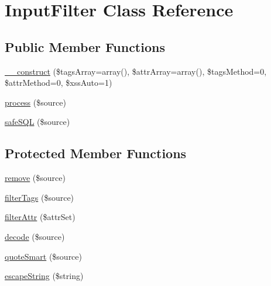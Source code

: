 \hypertarget{class_input_filter}{\section{Input\-Filter Class Reference}
\label{class_input_filter}
}
\subsection*{Public Member Functions}
\begin{DoxyCompactItemize}
\item 
\hyperlink{class_input_filter_ac48b3a07e4a3516c1d85ae3900cf3fb9}{\-\_\-\-\_\-construct} (\$tags\-Array=array(), \$attr\-Array=array(), \$tags\-Method=0, \$attr\-Method=0, \$xss\-Auto=1)
\item 
\hyperlink{class_input_filter_ac31900343e78d4b54e911d5af3c0b5e0}{process} (\$source)
\item 
\hyperlink{class_input_filter_a178f6ea15a691d60ebdcbcd2b7dbc743}{safe\-S\-Q\-L} (\$source)
\end{DoxyCompactItemize}
\subsection*{Protected Member Functions}
\begin{DoxyCompactItemize}
\item 
\hyperlink{class_input_filter_a591a2b5e435a9d6eabe460819c41159c}{remove} (\$source)
\item 
\hyperlink{class_input_filter_a533c70ae138d5d14952ff868a168400d}{filter\-Tags} (\$source)
\item 
\hyperlink{class_input_filter_aae4567b940a1791eaf23770c4aa4376e}{filter\-Attr} (\$attr\-Set)
\item 
\hyperlink{class_input_filter_a8c18f57237b969231418c2d66ecd125d}{decode} (\$source)
\item 
\hyperlink{class_input_filter_a93797cf4a5128b15af79cb1c41553f32}{quote\-Smart} (\$source)
\item 
\hyperlink{class_input_filter_afadf58dcf9a66f9bf52ee8d4a19db97b}{escape\-String} (\$string)
\end{DoxyCompactItemize}

